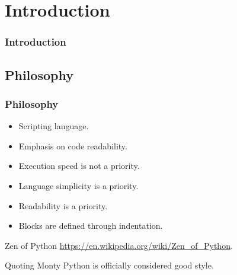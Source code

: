 
\section{Introduction}
\begin{frame}
    \frametitle{Introduction}
    \vspace{0mm}
    \begin{center}
    \end{center}
\end{frame}

\subsection{Philosophy}
\begin{frame}
    \frametitle{Philosophy}
    \vspace{5mm}
    \begin{itemize}
      \item Scripting language.
      \item Emphasis on code readability.
      \item Execution speed is not a priority.
      \item Language simplicity is a priority.
      \item Readability is a priority.
      \item Blocks are defined through indentation.
    \end{itemize}
    
    \pause
    \vspace{5mm}
    Zen of Python \url{https://en.wikipedia.org/wiki/Zen\_of\_Python}.
    
    \pause
    \vspace{5mm}
    Quoting Monty Python is officially considered good style.
\end{frame}

